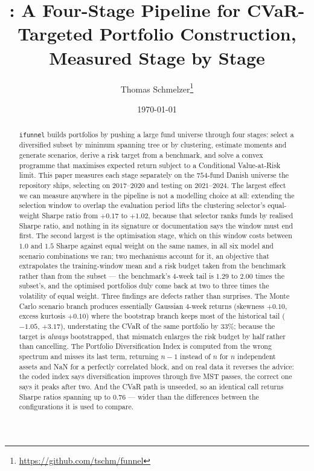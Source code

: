 \documentclass[11pt,a4paper]{article}
\title{\code{ifunnel}: A Four-Stage Pipeline for CVaR-Targeted Portfolio
Construction, Measured Stage by Stage}
\author{Thomas Schmelzer\thanks{\url{https://github.com/tschm/funnel}}}
\date{\today}
\newcommand{\code}[1]{\texttt{#1}}
\begin{document}
\maketitle

\begin{abstract}
\code{ifunnel} builds portfolios by pushing a large fund universe through four
stages: select a diversified subset by minimum spanning tree or by clustering,
estimate moments and generate scenarios, derive a risk target from a benchmark,
and solve a convex programme that maximises expected return subject to a
Conditional Value-at-Risk limit. This paper measures each stage separately on
the $754$-fund Danish universe the repository ships, selecting on $2017$--$2020$
and testing on $2021$--$2024$. The largest effect we can measure anywhere in the
pipeline is not a modelling choice at all: extending the selection window to
overlap the evaluation period lifts the clustering selector's equal-weight
Sharpe ratio from $+0.17$ to $+1.02$, because that selector ranks funds by
realised Sharpe ratio, and nothing in its signature or documentation says the
window must end first. The second largest is the optimisation stage, which on
this window costs between $1.0$ and $1.5$ Sharpe against equal weight on the
same names, in all six model and scenario combinations we ran; two mechanisms
account for it, an objective that extrapolates the training-window mean and a
risk budget taken from the benchmark rather than from the subset --- the
benchmark's $4$-week tail is $1.29$ to $2.00$ times the subset's, and the
optimised portfolios duly come back at two to three times the volatility of
equal weight. Three findings are defects rather than surprises. The Monte Carlo
scenario branch produces essentially Gaussian $4$-week returns (skewness
$+0.10$, excess kurtosis $+0.10$) where the bootstrap branch keeps most of the
historical tail ($-1.05$, $+3.17$), understating the CVaR of the same portfolio
by $33\%$; because the target is \emph{always} bootstrapped, that mismatch
enlarges the risk budget by half rather than cancelling. The Portfolio
Diversification Index is computed from the wrong spectrum and misses its last
term, returning $n-1$ instead of $n$ for $n$ independent assets and NaN for a
perfectly correlated block, and on real data it reverses the advice: the coded
index says diversification improves through five MST passes, the correct one
says it peaks after two. And the CVaR path is unseeded, so an identical call
returns Sharpe ratios spanning up to $0.76$ --- wider than the differences
between the configurations it is used to compare.
\end{abstract}
\end{document}
